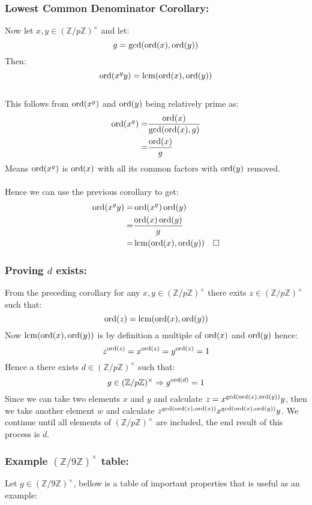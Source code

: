 \subsubsection{Lowest Common Denominator Corollary:}
Now let $x,y\in(\mathbb{Z}/p\mathbb{Z})^\times$ and let:
\[g=\gcd(\operatorname{ord}(x),\operatorname{ord}(y))\]
Then:
\[\operatorname{ord}(x^gy) = \operatorname{lcm}(\operatorname{ord}(x),\operatorname{ord}(y))\]
\\
This follows from $\operatorname{ord}(x^g)$ and $\operatorname{ord}(y)$ being relatively prime as:
\begin{equation*}
\begin{aligned}
	\operatorname{ord}(x^g)=&\frac{\operatorname{ord}(x)}{\gcd(\operatorname{ord}(x),g)}\\
	=&\frac{\operatorname{ord}(x)}{g}\\
\end{aligned}
\end{equation*}
Means $\operatorname{ord}(x^g)$ is $\operatorname{ord}(x)$ with all its common factors with $\operatorname{ord}(y)$ removed.
\\
\\
Hence we can use the previous corollary to get:
\begin{equation*}
\begin{aligned}
	\operatorname{ord}(x^gy)=&\operatorname{ord}(x^g)\operatorname{ord}(y)\\
	=&\frac{\operatorname{ord}(x)\operatorname{ord}(y)}{g}\\
	=&\operatorname{lcm}(\operatorname{ord}(x),\operatorname{ord}(y)) \quad \square\\
\end{aligned}
\end{equation*}

\subsubsection{Proving $d$ exists:}
From the preceding corollary for any $x,y\in(\mathbb{Z}/p\mathbb{Z})^\times$ there exits $z\in(\mathbb{Z}/p\mathbb{Z})^\times$ such that:
\[\operatorname{ord}(z) = \operatorname{lcm}(\operatorname{ord}(x),\operatorname{ord}(y))\]
Now $\operatorname{lcm}(\operatorname{ord}(x),\operatorname{ord}(y))$ is by definition a multiple of $\operatorname{ord}(x)$ and $\operatorname{ord}(y)$ hence:
\[z^{\operatorname{ord}(z)}=x^{\operatorname{ord}(z)}=y^{\operatorname{ord}(z)}=1\]
Hence a there exists $d\in(\mathbb{Z}/p\mathbb{Z})^\times$ such that:
\[g\in(\mathbb{Z}/p\mathbb{Z})^\times \Rightarrow g^{\operatorname{ord}(d)}=1\]
Since we can take two elements $x$ and $y$ and calculate $z=x^{\gcd(\operatorname{ord}(x),\operatorname{ord}(y))}y$,
then we take another element $w$ and calculate $z^{\gcd(\operatorname{ord}(z),\operatorname{ord}(x))}x^{\gcd(\operatorname{ord}(x),\operatorname{ord}(y))}y$.
We continue until all elements of $(\mathbb{Z}/p\mathbb{Z})^\times$ are included,
the end result of this process is $d$.
\subsubsection{Example $(\mathbb{Z}/9\mathbb{Z})^\times$ table:}
Let $g\in(\mathbb{Z}/9\mathbb{Z})^\times$,
bellow is a table of important properties that is useful as an example:

